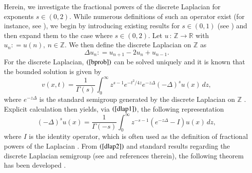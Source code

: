 \documentclass[final,1p,times]{elsarticle}
\def\ZZ{\mathbb Z} %
\def\RR{\mathbb R} %
\def\l{\left}
\def\r{\right}
\newcommand{\bb}[1]{\begin{equation}\label{#1}}
\newcommand{\ee}{\end{equation}}
\def\R#1{$(\ref{#1})$}
\theoremstyle{remark}
\theoremstyle{definition}
\begin{document}
Herein, we investigate the fractional powers of the discrete Laplacian for exponents $s\in(0,2).$ 
While numerous definitions of such an operator exist (for instance, see \cite{kwasnicki2017ten}), we begin by introducing existing results for $s\in(0,1)$ (see \cite{ciaurri2016nonlocal,ciaurri2015fractional}) and then expand them to the case where $s\in(0,2).$
Let $u\,:\,\ZZ\to\RR$ with $u_n\mathrel{\mathop:}= u(n),\ n\in\ZZ.$ We then define the discrete Laplacian on $\ZZ$ as
\bb{dlap}
\Delta u_n \mathrel{\mathop:}= u_{n+1}-2u_n+u_{n-1}.
\ee
For the discrete Laplacian, \R{bprob} can be solved uniquely and it is known that the bounded solution is given by
\bb{extsol}
v(x,t) = \frac{1}{\Gamma(s)}\int_0^\infty z^{s-1}e^{-t^2/4z}e^{-z\Delta}(-\Delta)^su(x)\,dz,
\ee
where $e^{-z\Delta}$ is the standard semigroup generated by the discrete Laplacian on $\ZZ$ \cite{ciaurri2016nonlocal,meichsner2017fractional,doi:10.1080/03605301003735680,Gale2013}. Explicit calculation then yields, via \R{dlap1}, the following representation
\bb{dlap2}
(-\Delta)^s u(x) = \frac{1}{\Gamma(-s)}\int_0^\infty z^{-s-1}\l(e^{-z\Delta}-I\r)u(x)\,dz,
\ee
where $I$ is the identity operator,
which is often used as the definition of fractional powers of the Laplacian \cite{ciaurri2016nonlocal,ciaurri2015fractional}. From \R{dlap2} and standard results regarding the discrete Laplacian semigroup (see \cite{Ciaurri2017} and references therein), the following theorem has been developed \cite{ciaurri2015fractional}. 
\end{document}

